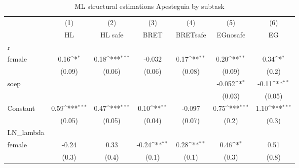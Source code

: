 \begin{table}[htbp]\centering
\def\sym#1{\ifmmode^{#1}\else\(^{#1}\)\fi}
\caption{ML structural estimations Apesteguia by subtask \label{tab:Success}}
\begin{tabular}{l*{6}{c}}
\toprule
                    &\multicolumn{1}{c}{(1)}&\multicolumn{1}{c}{(2)}&\multicolumn{1}{c}{(3)}&\multicolumn{1}{c}{(4)}&\multicolumn{1}{c}{(5)}&\multicolumn{1}{c}{(6)}\\
                    &\multicolumn{1}{c}{HL}&\multicolumn{1}{c}{HL safe}&\multicolumn{1}{c}{BRET}&\multicolumn{1}{c}{BRETsafe}&\multicolumn{1}{c}{EGnosafe}&\multicolumn{1}{c}{EG}\\
\midrule
r                   &                     &                     &                     &                     &                     &                     \\
female              &        0.16\sym{*}  &        0.18\sym{***}&      -0.032         &        0.17\sym{**} &        0.20\sym{**} &        0.34\sym{*}  \\
                    &      (0.09)         &      (0.06)         &      (0.06)         &      (0.08)         &      (0.09)         &       (0.2)         \\
\addlinespace
soep                &                     &                     &                     &                     &      -0.052\sym{*}  &       -0.11\sym{**} \\
                    &                     &                     &                     &                     &      (0.03)         &      (0.05)         \\
\addlinespace
Constant            &        0.59\sym{***}&        0.47\sym{***}&        0.10\sym{**} &      -0.097         &        0.75\sym{***}&        1.10\sym{***}\\
                    &      (0.05)         &      (0.05)         &      (0.04)         &      (0.07)         &       (0.2)         &       (0.3)         \\
\midrule
LN\_lambda           &                     &                     &                     &                     &                     &                     \\
female              &       -0.24         &        0.33         &       -0.24\sym{**} &        0.28\sym{**} &        0.46\sym{*}  &        0.51         \\
                    &       (0.3)         &       (0.4)         &       (0.1)         &       (0.1)         &       (0.3)         &       (0.8)         \\

\end{tabular}
\end{table}
